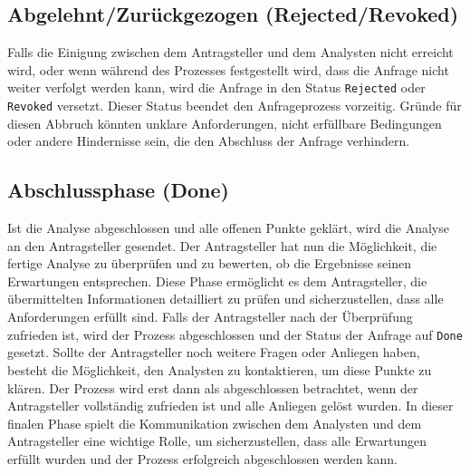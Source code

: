 \subsection*{Abgelehnt/Zur{\"u}ckgezogen (Rejected/Revoked)}
Falls die Einigung zwischen dem Antragsteller und dem Analysten nicht erreicht wird, oder wenn während des Prozesses festgestellt wird, dass die Anfrage nicht weiter verfolgt werden kann, wird die Anfrage in den Status \texttt{Rejected} oder \texttt{Revoked} versetzt. Dieser Status beendet den Anfrageprozess vorzeitig. Gründe für diesen Abbruch könnten unklare Anforderungen, nicht erfüllbare Bedingungen oder andere Hindernisse sein, die den Abschluss der Anfrage verhindern.
\subsection*{Abschlussphase (Done)}
Ist die Analyse abgeschlossen und alle offenen Punkte geklärt, wird die Analyse an den Antragsteller gesendet. Der Antragsteller hat nun die Möglichkeit, die fertige Analyse zu überprüfen und zu bewerten, ob die Ergebnisse seinen Erwartungen entsprechen. Diese Phase ermöglicht es dem Antragsteller, die übermittelten Informationen detailliert zu prüfen und sicherzustellen, dass alle Anforderungen erfüllt sind.
\newline
Falls der Antragsteller nach der Überprüfung zufrieden ist, wird der Prozess abgeschlossen und der Status der Anfrage auf \texttt{Done} gesetzt. Sollte der Antragsteller noch weitere Fragen oder Anliegen haben, besteht die Möglichkeit, den Analysten zu kontaktieren, um diese Punkte zu klären. Der Prozess wird erst dann als abgeschlossen betrachtet, wenn der Antragsteller vollständig zufrieden ist und alle Anliegen gelöst wurden.
\newline
In dieser finalen Phase spielt die Kommunikation zwischen dem Analysten und dem Antragsteller eine wichtige Rolle, um sicherzustellen, dass alle Erwartungen erfüllt wurden und der Prozess erfolgreich abgeschlossen werden kann.
